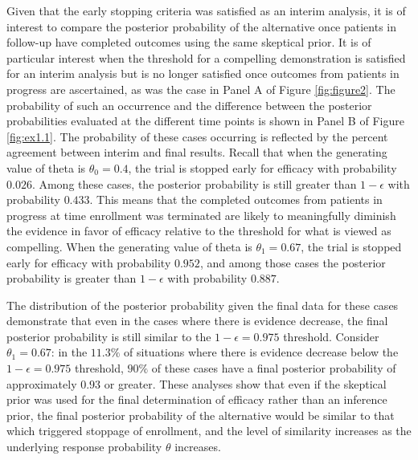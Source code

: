 \documentclass[useAMS,usenatbib,referee]{biom}
\begin{document}
Given that the early stopping criteria was satisfied as an interim analysis, it is of interest to compare the posterior probability of the alternative once patients in follow-up have completed outcomes using the same skeptical prior.
%
It is of particular interest when the threshold for a compelling demonstration is satisfied for an interim analysis but is no longer satisfied once outcomes from patients in progress are ascertained, as was the case in Panel A of Figure \ref{fig:figure2}.
%
The probability of such an occurrence and the difference between the posterior probabilities evaluated at the different time points is shown in Panel B of Figure \ref{fig:ex1.1}.
%
The probability of these cases occurring is reflected by the percent agreement between interim and final results.
%
Recall that when the generating value of theta is $\theta_0=0.4$, the trial is stopped early for efficacy with probability $0.026$. Among these cases, the posterior probability is still greater than $1-\epsilon$ with probability $0.433$. 
%
This means that the completed outcomes from patients in progress at time enrollment was terminated are likely to meaningfully diminish the evidence in favor of efficacy relative to the threshold for what is viewed as compelling.
%
When the generating value of theta is $\theta_1=0.67$, the trial is stopped early for efficacy with probability $0.952$, and among those cases the posterior probability is  greater than $1-\epsilon$ with probability $0.887$.

The distribution of the posterior probability given the final data for these cases demonstrate that even in the cases where there is evidence decrease, the final posterior probability is still similar to the $1-\epsilon=0.975$ threshold.
%
Consider $\theta_1=0.67$: in the $11.3\%$ of situations where there is evidence decrease below the $1-\epsilon=0.975$ threshold, $90\%$ of these cases have a final posterior probability of approximately $0.93$ or greater. 
%
These analyses show that even if the skeptical prior was used for the final determination of efficacy rather than an inference prior, the final posterior probability of the alternative would be similar to that which triggered stoppage of enrollment, and the level of similarity increases as the underlying response probability $\theta$ increases.
%
\end{document}
